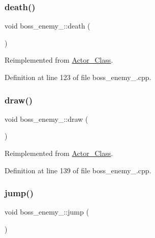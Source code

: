 \subsubsection{\texorpdfstring{death()}{death()}}
{\footnotesize\ttfamily void boss\+\_\+enemy\+\_\+::death (\begin{DoxyParamCaption}{ }\end{DoxyParamCaption})\hspace{0.3cm}{\ttfamily [virtual]}}



Reimplemented from \hyperlink{class_actor___class_a9447c6154a674d7e6bdf24ff2874b7a8}{Actor\+\_\+\+Class}.



Definition at line 123 of file boss\+\_\+enemy\+\_.\+cpp.

\hypertarget{classboss__enemy__2_aea8e734cf65b63f1d8ba143f3b449f63}{}\label{classboss__enemy__2_aea8e734cf65b63f1d8ba143f3b449f63} 
\subsubsection{\texorpdfstring{draw()}{draw()}}
{\footnotesize\ttfamily void boss\+\_\+enemy\+\_\+::draw (\begin{DoxyParamCaption}{ }\end{DoxyParamCaption})\hspace{0.3cm}{\ttfamily [virtual]}}



Reimplemented from \hyperlink{class_actor___class_ac49cd62be76b4b950ecbe155413f1b64}{Actor\+\_\+\+Class}.



Definition at line 139 of file boss\+\_\+enemy\+\_.\+cpp.

\hypertarget{classboss__enemy__2_a7edccc066047aacf21797b6d4316f57c}{}\label{classboss__enemy__2_a7edccc066047aacf21797b6d4316f57c} 
\subsubsection{\texorpdfstring{jump()}{jump()}}
{\footnotesize\ttfamily void boss\+\_\+enemy\+\_\+::jump (\begin{DoxyParamCaption}{ }\end{DoxyParamCaption})\hspace{0.3cm}{\ttfamily [virtual]}}



